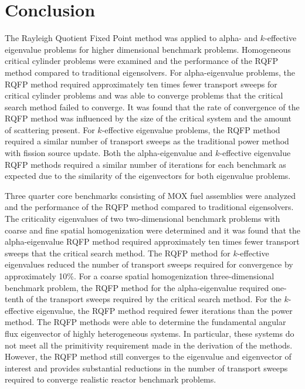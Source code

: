 
\clearpage

\section{Conclusion}

The Rayleigh Quotient Fixed Point method was applied to alpha- and $k$-effective eigenvalue problems for higher dimensional benchmark problems. Homogeneous critical cylinder problems were examined and the performance of the RQFP method compared to traditional eigensolvers. For alpha-eigenvalue problems, the RQFP method required approximately ten times fewer transport sweeps for critical cylinder problems and was able to converge problems that the critical search method failed to converge. It was found that the rate of convergence of the RQFP method was influenced by the size of the critical system and the amount of scattering present. For $k$-effective eigenvalue problems, the RQFP method required a similar number of transport sweeps as the traditional power method with fission source update. Both the alpha-eigenvalue and $k$-effective eigenvalue RQFP methods required a similar number of iterations for each benchmark as expected due to the similarity of the eigenvectors for both eigenvalue problems.

Three quarter core benchmarks consisting of MOX fuel assemblies were analyzed and the performance of the RQFP method compared to traditional eigensolvers. The criticality eigenvalues of two two-dimensional benchmark problems with coarse and fine spatial homogenization were determined and it was found that the alpha-eigenvalue RQFP method required approximately ten times fewer transport sweeps that the critical search method. The RQFP method for $k$-effective eigenvalues reduced the number of transport sweeps required for convergence by approximately 10\%. For a coarse spatial homogenization three-dimensional benchmark problem, the RQFP method for the alpha-eigenvalue required one-tenth of the transport sweeps required by the critical search method. For the $k$-effective eigenvalue, the RQFP method required fewer iterations than the power method. The RQFP methods were able to determine the fundamental angular flux eigenvector of highly heterogeneous systems. In particular, these systems do not meet all the primitivity requirement made in the derivation of the methods. However, the RQFP method still converges to the eigenvalue and eigenvector of interest and provides substantial reductions in the number of transport sweeps required to converge realistic reactor benchmark problems.